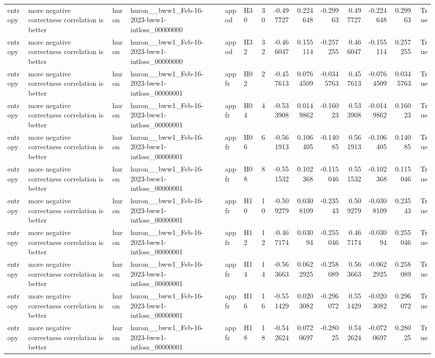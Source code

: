 \begin{longtable}{llllllrrrrrrrr}
entropy & more negative correctness correlation is better & huron & huron\_\_bww1\_Feb-16-2023-bww1-intloss\_00000000 & appod & H30 & 30 & -0.497727 & 0.224648 & -0.29963 & 0.497727 & -0.224648 & 0.29963 & True \\
entropy & more negative correctness correlation is better & huron & huron\_\_bww1\_Feb-16-2023-bww1-intloss\_00000000 & appod & H32 & 32 & -0.466047 & 0.155114 & -0.257255 & 0.466047 & -0.155114 & 0.257255 & True \\
entropy & more negative correctness correlation is better & huron & huron\_\_bww1\_Feb-16-2023-bww1-intloss\_00000001 & appfr & H02 & 2 & -0.457613 & 0.0764509 & -0.0345763 & 0.457613 & -0.0764509 & 0.0345763 & True \\
entropy & more negative correctness correlation is better & huron & huron\_\_bww1\_Feb-16-2023-bww1-intloss\_00000001 & appfr & H04 & 4 & -0.533908 & 0.0149862 & -0.16023 & 0.533908 & -0.0149862 & 0.16023 & True \\
entropy & more negative correctness correlation is better & huron & huron\_\_bww1\_Feb-16-2023-bww1-intloss\_00000001 & appfr & H06 & 6 & -0.561913 & 0.106405 & -0.14085 & 0.561913 & -0.106405 & 0.14085 & True \\
entropy & more negative correctness correlation is better & huron & huron\_\_bww1\_Feb-16-2023-bww1-intloss\_00000001 & appfr & H08 & 8 & -0.551532 & 0.102368 & -0.115046 & 0.551532 & -0.102368 & 0.115046 & True \\
entropy & more negative correctness correlation is better & huron & huron\_\_bww1\_Feb-16-2023-bww1-intloss\_00000001 & appfr & H10 & 10 & -0.509279 & 0.0308109 & -0.23543 & 0.509279 & -0.0308109 & 0.23543 & True \\
entropy & more negative correctness correlation is better & huron & huron\_\_bww1\_Feb-16-2023-bww1-intloss\_00000001 & appfr & H12 & 12 & -0.467174 & 0.03094 & -0.255046 & 0.467174 & -0.03094 & 0.255046 & True \\
entropy & more negative correctness correlation is better & huron & huron\_\_bww1\_Feb-16-2023-bww1-intloss\_00000001 & appfr & H14 & 14 & -0.563663 & 0.0622925 & -0.258089 & 0.563663 & -0.0622925 & 0.258089 & True \\
entropy & more negative correctness correlation is better & huron & huron\_\_bww1\_Feb-16-2023-bww1-intloss\_00000001 & appfr & H16 & 16 & -0.551429 & 0.0203082 & -0.296072 & 0.551429 & -0.0203082 & 0.296072 & True \\
entropy & more negative correctness correlation is better & huron & huron\_\_bww1\_Feb-16-2023-bww1-intloss\_00000001 & appfr & H18 & 18 & -0.542624 & 0.0720697 & -0.28025 & 0.542624 & -0.0720697 & 0.28025 & True \\

\end{longtable}
